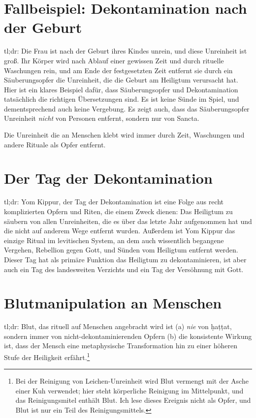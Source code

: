 \section{\label{sec-parturient}Fallbeispiel: Dekontamination nach der Geburt}
tl;dr:
Die Frau ist nach der Geburt ihres Kindes unrein, und diese Unreinheit ist groß.
Ihr Körper wird nach Ablauf einer gewissen Zeit und durch rituelle Waschungen rein, und am Ende der festgesetzten Zeit entfernt sie durch ein Säuberungsopfer die Unreinheit,
die die Geburt am Heiligtum verursacht hat.
Hier ist ein klares Beispiel dafür, dass Säuberungsopfer und Dekontamination tatsächlich die richtigen Übersetzungen sind.
Es ist keine Sünde im Spiel, und dementsprechend auch keine Vergebung.
Es zeigt auch, dass das Säuberungsopfer Unreinheit \textit{nicht} von Personen entfernt, sondern nur von Sancta.


Die Unreinheit die an Menschen klebt wird immer durch Zeit, Waschungen und andere Rituale als Opfer entfernt.

\section{\label{sec:yom-kippur}Der Tag der Dekontamination}
tl;dr:
Yom Kippur, der Tag der Dekontamination ist eine Folge aus recht komplizierten Opfern und Riten, die einem Zweck dienen:
Das Heiligtum zu säubern von allen Unreinheiten, die es über das letzte Jahr aufgenommen hat und die nicht auf anderem Wege entfernt wurden.
Außerdem ist Yom Kippur das einzige Ritual im levitischen System, an dem auch wissentlich begangene Vergehen, Rebellion gegen Gott, und Sünden vom Heiligtum entfernt werden.
Dieser Tag hat als primäre Funktion das Heiligtum zu dekontaminieren, ist aber auch ein Tag des landesweiten Verzichts und ein Tag der Versöhnung mit Gott.

% 
\section{\label{metaphysische-transformation}Blutmanipulation an Menschen}
tl;dr: Blut, das rituell auf Menschen angebracht wird ist
(a) \textit{nie} von ḥaṭṭat, sondern immer von nicht-dekontaminierenden Opfern
(b) die konsistente Wirkung ist, dass der Mensch eine metaphysische Transformation hin zu einer höheren Stufe der Heiligkeit erfährt.\footnote{
Bei der Reinigung von Leichen-Unreinheit wird Blut vermengt mit der Asche einer Kuh verwendet; hier steht körperliche Reinigung im Mittelpunkt, und das Reinigungsmitel enthält Blut.
Ich lese dieses Ereignis nicht als Opfer, und Blut ist nur ein Teil des Reinigungsmittels.}

